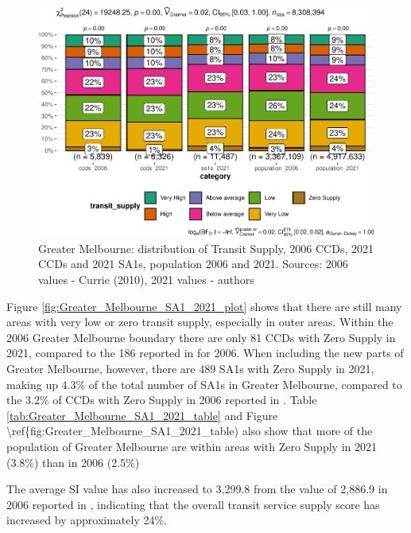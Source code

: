 \documentclass[preprint, 3p,
authoryear]{elsarticle} %
\begin{document}
\begin{figure}
\centering
\includegraphics{Leveraging_GTFS_to_assess_transit_supply_Transport_Geography_files/figure-latex/Greater_Melbourne_SA1_2021_table-1.pdf}
\caption{Greater Melbourne: distribution of Transit Supply, 2006 CCDs,
2021 CCDs and 2021 SA1s, population 2006 and 2021. Sources: 2006 values
- Currie (2010), 2021 values - authors}
\end{figure}

Figure \ref{fig:Greater_Melbourne_SA1_2021_plot} shows that there are
still many areas with very low or zero transit supply, especially in
outer areas. Within the 2006 Greater Melbourne boundary there are only
81 CCDs with Zero Supply in 2021, compared to the 186 reported in
\citet{currie2010identifying} for 2006. When including the new parts of
Greater Melbourne, however, there are 489 SA1s with Zero Supply in 2021,
making up 4.3\% of the total number of SA1s in Greater Melbourne,
compared to the 3.2\% of CCDs with Zero Supply in 2006 reported in
\citet{currie2010identifying}. Table
\ref{tab:Greater_Melbourne_SA1_2021_table} and Figure
\textbackslash ref\{fig:Greater\_Melbourne\_SA1\_2021\_table) also show
that more of the population of Greater Melbourne are within areas with
Zero Supply in 2021 (3.8\%) than in 2006 (2.5\%)

The average SI value has also increased to 3,299.8 from the value of
2,886.9 in 2006 reported in \citet{currie2010identifying}, indicating
that the overall transit service supply score has increased by
approximately 24\%.
\end{document}
